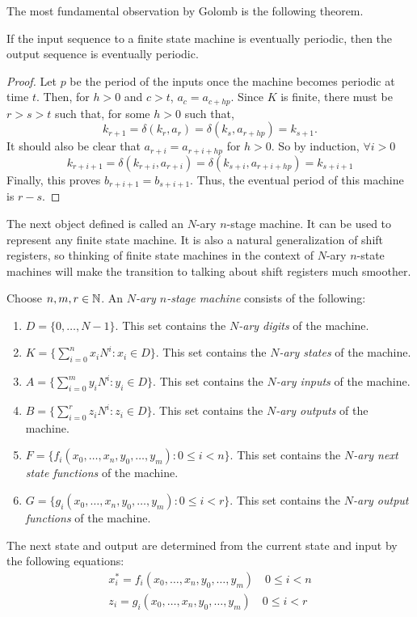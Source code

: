 
\par The most fundamental observation by Golomb is the following theorem.

\begin{theorem}\label{thm:golomb-2}
  If the input sequence to a finite state machine is eventually periodic, then
  the output sequence is eventually periodic.
\end{theorem}
\begin{proof}
  Let $p$ be the period of the inputs once the machine becomes periodic at time
  $t$. Then, for $h>0$ and $c>t$, $a_c=a_{c+hp}$. Since $K$ is finite, there
  must be $r>s>t$ such that, for some $h>0$ such that,
  \[
  k_{r+1}=\delta(k_r,a_r)=\delta(k_s,a_{r+hp})=k_{s+1}.
  \]
  It should also be clear that $a_{r+i}=a_{r+i+hp}$ for $h>0$. So by induction,
  $\forall i>0$
  \[
  k_{r+i+1}=\delta(k_{r+i},a_{r+i})=\delta(k_{s+i},a_{r+i+hp})=k_{s+i+1}
  \]
  Finally, this proves $b_{r+i+1}=b_{s+i+1}$. Thus, the eventual period of this
  machine is $r-s$.
\end{proof}

\par The next object defined is called an $N$-ary $n$-stage machine. It can be
used to represent any finite state machine. It is also a natural generalization
of shift registers, so thinking of finite state machines in the context of
$N$-ary $n$-state machines will make the transition to talking about shift
registers much smoother.

\begin{definition}\label{N-ary-n-stage-machine}
  Choose $n,m,r\in\mathbb{N}$. An {\em $N$-ary $n$-stage machine} consists of the
  following:
  \begin{enumerate}[1.]
    \item $D=\{0,\dots,N-1\}$. This set contains the {\em $N$-ary digits} of the
      machine.
    \item $K=\{\sum_{i=0}^{n}x_iN^i:x_i\in D\}$. This set contains the
      {\em $N$-ary states} of the machine.
    \item $A=\{\sum_{i=0}^{m}y_iN^i:y_i\in D\}$. This set contains the
      {\em $N$-ary inputs} of the machine.
    \item $B=\{\sum_{i=0}^{r}z_iN^i:z_i\in D\}$. This set contains the
      {\em $N$-ary outputs} of the machine.
    \item $F=\{f_i(x_0,\dots,x_n,y_0,\dots,y_m):0\le i<n\}$. This set contains
      the {\em $N$-ary next state functions} of the machine.
    \item $G=\{g_i(x_0,\dots,x_n,y_0,\dots,y_m):0\le i<r\}$. This set contains
      the {\em $N$-ary output functions} of the machine.
  \end{enumerate}
  The next state and output are determined from the current state and input by the
  following equations:
  \begin{eqnarray}
    x_i^*=f_i(x_0,\dots,x_n,y_0,\dots,y_m) \quad 0\le i<n \\
    z_i=g_i(x_0,\dots,x_n,y_0,\dots,y_m) \quad 0\le i<r
  \end{eqnarray}
\end{definition}


